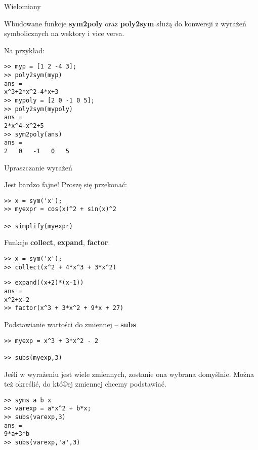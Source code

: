 \documentclass[12pt]{amsbook}
\theoremstyle{definition}
\begin{document}
\begin{center}
Wielomiany\\
\end{center}

Wbudowane funkcje \textbf{sym2poly} oraz \textbf{poly2sym} służą do konwersji z wyrażeń symbolicznych na wektory i vice versa.

Na przykład:

\begin{lstlisting}
>> myp = [1 2 -4 3];
>> poly2sym(myp)
ans =
x^3+2*x^2-4*x+3
>> mypoly = [2 0 -1 0 5];
>> poly2sym(mypoly)
ans =
2*x^4-x^2+5
>> sym2poly(ans)
ans =
2	0 	-1	 0	 5
\end{lstlisting}

\begin{center}
Upraszczanie wyrażeń\\
\end{center}

Jest bardzo fajne!
Proszę się przekonać:

\begin{lstlisting}
>> x = sym('x');
>> myexpr = cos(x)^2 + sin(x)^2

>> simplify(myexpr)
\end{lstlisting}

Funkcje \textbf{collect}, \textbf{expand}, \textbf{factor}.


\begin{lstlisting}
>> x = sym('x');
>> collect(x^2 + 4*x^3 + 3*x^2)
\end{lstlisting}

\begin{lstlisting}
>> expand((x+2)*(x-1))
ans =
x^2+x-2
>> factor(x^3 + 3*x^2 + 9*x + 27)
\end{lstlisting}

\begin{center}
Podstawianie wartości do zmiennej -- \textbf{subs}\\
\end{center}


\begin{lstlisting}
>> myexp = x^3 + 3*x^2 - 2

>> subs(myexp,3)
\end{lstlisting}

Jeśli w wyrażeniu jest wiele zmiennych, zostanie ona wybrana domyślnie.
Można też określić, do któ©ej zmiennej chcemy podstawiać.
\begin{lstlisting}
>> syms a b x
>> varexp = a*x^2 + b*x;
>> subs(varexp,3)
ans =
9*a+3*b
>> subs(varexp,'a',3)
\end{lstlisting}
\end{document}
